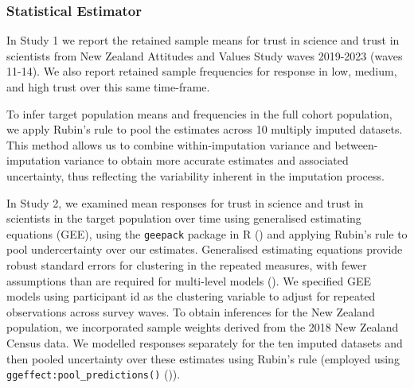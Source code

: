 \documentclass[
  single column]{article}
\begin{document}
\subsubsection{Statistical Estimator}\label{statistical-estimator}

In Study 1 we report the retained sample means for trust in science and
trust in scientists from New Zealand Attitudes and Values Study waves
2019-2023 (waves 11-14). We also report retained sample frequencies for
response in low, medium, and high trust over this same time-frame.

To infer target population means and frequencies in the full cohort
population, we apply Rubin's rule to pool the estimates across 10
multiply imputed datasets. This method allows us to combine
within-imputation variance and between-imputation variance to obtain
more accurate estimates and associated uncertainty, thus reflecting the
variability inherent in the imputation process.

In Study 2, we examined mean responses for trust in science and trust in
scientists in the target population over time using generalised
estimating equations (GEE), using the \texttt{geepack} package in R
() and applying
Rubin's rule to pool undercertainty over our estimates. Generalised
estimating equations provide robust standard errors for clustering in
the repeated measures, with fewer assumptions than are required for
multi-level models (). We specified GEE models using participant id as
the clustering variable to adjust for repeated observations across
survey waves. To obtain inferences for the New Zealand population, we
incorporated sample weights derived from the 2018 New Zealand Census
data. We modelled responses separately for the ten imputed datasets and
then pooled uncertainty over these estimates using Rubin's rule
(employed using \texttt{ggeffect:pool\_predictions()}
()).
\end{document}
